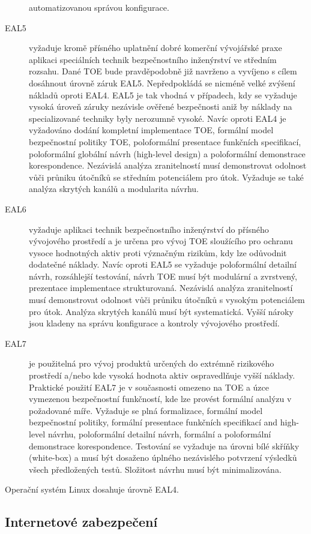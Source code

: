 \documentclass[a4paper,12pt]{article}
\begin{document}
\begin{description}
automatizovanou správou konfigurace.
\item[EAL5]vyžaduje kromě přísného uplatnění dobré komerční vývojářské praxe
aplikaci
speciálních technik bezpečnostního inženýrství ve středním rozsahu. Dané TOE bude pravděpodobně
již navrženo a vyvíjeno s cílem dosáhnout úrovně záruk EAL5. Nepředpokládá se nicméně velké
zvýšení nákladů oproti EAL4. EAL5 je tak vhodná v případech, kdy se vyžaduje vysoká úroveň
záruky nezávisle ověřené bezpečnosti aniž by náklady na specializované techniky byly nerozumně
vysoké. Navíc oproti EAL4 je vyžadováno dodání kompletní implementace TOE, formální model
bezpečnostní politiky TOE, poloformální presentace funkčních specifikací, poloformální globální
návrh (high-level design) a poloformální demonstrace korespondence. Nezávislá analýza zranitelností
musí demonstrovat odolnost vůči průniku útočníků se středním potenciálem pro útok. Vyžaduje se
také analýza skrytých kanálů a modularita návrhu.
\item[EAL6] vyžaduje aplikaci technik bezpečnostního inženýrství do přísného vývojového prostředí a
je určena pro vývoj TOE sloužícího pro ochranu vysoce hodnotných aktiv proti význačným rizikům,
kdy lze odůvodnit dodatečné náklady. Navíc oproti EAL5 se vyžaduje poloformální detailní návrh,
rozsáhlejší testování, návrh TOE musí být modulární a zvrstvený, prezentace implementace
strukturovaná. Nezávislá analýza zranitelností musí demonstrovat odolnost vůči průniku útočníků
s vysokým potenciálem pro útok. Analýza skrytých kanálů musí být systematická. Vyšší nároky jsou
kladeny na správu konfigurace a kontroly vývojového prostředí.
\item[EAL7] je použitelná pro vývoj produktů určených do extrémně rizikového prostředí a/nebo kde
vysoká hodnota aktiv ospravedlňuje vyšší náklady. Praktické použití EAL7 je v současnosti
omezeno na TOE a úzce vymezenou bezpečnostní funkčností, kde lze provést formální analýzu
v požadované míře. Vyžaduje se plná formalizace, formální model bezpečnostní politiky, formální
presentace funkčních specifikací and high-level návrhu, poloformální detailní návrh, formální a
poloformální demonstrace korespondence. Testování se vyžaduje na úrovni bílé skříňky (white-box)
a musí být dosaženo úplného nezávislého potvrzení výsledků všech předložených testů. Složitost
návrhu musí být minimalizována.
\end{description}
Operační systém Linux dosahuje úrovně EAL4.~\cite{CCredhat}~\cite{CCsuse}

\subsection{Internetové zabezpečení}
\end{document}
